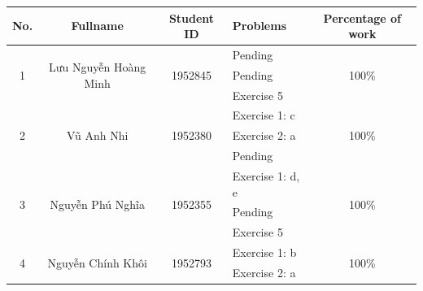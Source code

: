 \documentclass[a4paper]{article}
\begin{document}
\begin{center}
  \begin{tabular}{|c|c|c|l|c|}
    \hline
    \textbf{No.}       & \textbf{Fullname}                      & \textbf{Student ID}      & \textbf{Problems}              & \textbf{Percentage of work} \\
    \hline
    \multirow{3}{*}{1} & \multirow{3}{*}{Lưu Nguyễn Hoàng Minh} & \multirow{3}{*}{1952845} & \textendash{} Pending          & \multirow{3}{*}{100\%}      \\
                       &                                        &                          & \textendash{} Pending          &                             \\
                       &                                        &                          & \textendash{} Exercise 5       &                             \\
    \hline
    \multirow{3}{*}{2} & \multirow{3}{*}{Vũ Anh Nhi}            & \multirow{3}{*}{1952380} & \textendash{} Exercise 1: c    & \multirow{3}{*}{100\%}      \\
                       &                                        &                          & \textendash{} Exercise 2: a    &                             \\
                       &                                        &                          & \textendash{} Pending          &                             \\
    \hline
    \multirow{3}{*}{3} & \multirow{3}{*}{Nguyễn Phú Nghĩa}      & \multirow{3}{*}{1952355} & \textendash{} Exercise 1: d, e & \multirow{3}{*}{100\%}      \\
                       &                                        &                          & \textendash{} Pending          &                             \\
                       &                                        &                          & \textendash{} Exercise 5       &                             \\
    \hline
    \multirow{3}{*}{4} & \multirow{3}{*}{Nguyễn Chính Khôi}     & \multirow{3}{*}{1952793} & \textendash{} Exercise 1: b    & \multirow{3}{*}{100\%}      \\
                       &                                        &                          & \textendash{} Exercise 2: a    &                             \\

\end{tabular}
\end{center}
\end{document}
